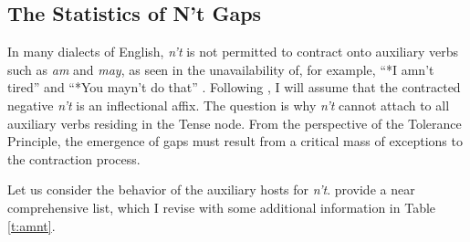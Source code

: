 \documentclass[output=paper,
modfonts
]{LSP/langsci}
\begin{document}
\subsection{The Statistics of  N't Gaps}

In many dialects 
of English, \emph{n't} is not permitted to contract onto 
auxiliary verbs such as \emph{am} and \emph{may}, as seen in the unavailability of, for
example, ``*I amn't tired'' and ``*You mayn't do that''
\citep[e.g.,][]{Anderwald2003, 
  Bresnan2001HB, Broadbent2009, Frampton2001,Hudson2000,Zwicky1983a}. 
Following \citet{Zwicky1983a}, I will  assume that the contracted
negative \emph{n't}  is an inflectional affix. The question 
is why \emph{n't} cannot attach to all auxiliary verbs residing
in the Tense node.
From the perspective of the Tolerance Principle, the emergence of gaps
must result from a critical mass of  exceptions to the contraction
process.   

Let us consider the behavior of the auxiliary hosts for \emph{n't}. 
\citet[][ p508]{Zwicky1983a}  provide  a near comprehensive list,
which I revise with some additional information in Table 
\ref{t:amnt}. 
\end{document}
